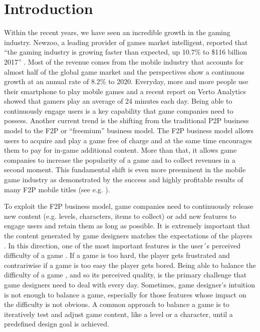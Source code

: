 \chapter{Introduction}
Within the recent years, we have seen an incredible growth in the gaming industry. Newzoo, a leading provider of games market intelligent, reported that “the gaming industry is growing faster than expected, up 10.7\% to \$116 billion 2017” \cite{takahashi_game_2017}. Most of the revenue comes from the mobile industry that accounts for almost half of the global game market and the perspectives show a continuous growth at an annual rate of 8.2\% to 2020. Everyday, more and more people use their smartphone to play mobile games and a recent report on Verto Analytics \cite{hwong_leveling_2016} showed that gamers play an average of 24 minutes each day. Being able to continuously engage users is a key capability that game companies need to possess. Another current trend is the shifting from the traditional \acf{P2P} business model to the \acf{F2P} or “freemium” business model. The \acs{F2P} business model allows users to acquire and play a game free of charge and at the same time encourages them to pay for in-game additional content. More than that, it allows game companies to increase the popularity of a game and to collect revenues in a second moment. This fundamental shift is even more preeminent in the mobile game industry as demonstrated by the success and highly profitable results of many \acs{F2P} mobile titles (see e.g. \cite{alha_critical_2016,alha_free--play_2014,fields_mobile_2014,civelek_pricing_2018,hamari_service_2017,hamari_why_2017}). 

To exploit the \acs{F2P} business model, game companies need to continuously release new content (e.g. levels, characters, items to collect) or add new features to engage users and retain them as long as possible. It is extremely important that the content generated by game designers matches the expectations of the players \cite{hamari_service_2017}. In this direction, one of the most important features is the user´s perceived difficulty of a game \cite{alexander_investigation_2013}. If a game is too hard, the player gets frustrated and contrariwise if a game is too easy the player gets bored. Being able to balance the difficulty of a game \cite{hunicke_case_2005}, and so its perceived quality, is the primary challenge that game designers need to deal with every day. Sometimes, game designer’s intuition is not enough to balance a game, especially for those features whose impact on the difficulty is not obvious. A common approach to balance a game is to iteratively test and adjust game content, like a level or a character, until a predefined design goal is achieved. 

